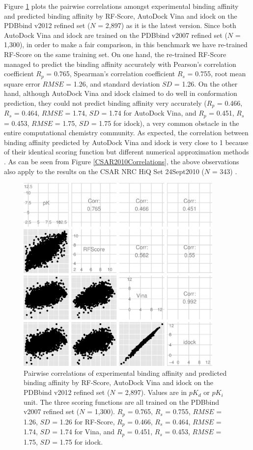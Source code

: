 Figure \ref{PDBbind2012Correlations} plots the pairwise correlations amongst experimental binding affinity and predicted binding affinity by RF-Score, AutoDock Vina and idock on the PDBbind v2012 \citep{529,530} refined set ($N$ = 2,897) as it is the latest version. Since both AutoDock Vina and idock are trained on the PDBbind v2007 refined set ($N$ = 1,300), in order to make a fair comparison, in this benchmark we have re-trained RF-Score on the same training set. On one hand, the re-trained RF-Score managed to predict the binding affinity accurately with Pearson's correlation coefficient $R_p$ = 0.765, Spearman's correlation coefficient $R_s$ = 0.755, root mean square error $RMSE$ = 1.26, and standard deviation $SD$ = 1.26. On the other hand, although AutoDock Vina and idock claimed to do well in conformation prediction, they could not predict binding affinity very accurately ($R_p$ = 0.466, $R_s$ = 0.464, $RMSE$ = 1.74, $SD$ = 1.74 for AutoDock Vina, and $R_p$ = 0.451, $R_s$ = 0.453, $RMSE$ = 1.75, $SD$ = 1.75 for idock), a very common obstacle in the entire computational chemistry community. As expected, the correlation between binding affinity predicted by AutoDock Vina and idock is very close to 1 because of their identical scoring function but different numerical approximation methods \citep{1153}. As can be seen from Figure \ref{CSAR2010Correlations}, the above observations also apply to the results on the CSAR NRC HiQ Set 24Sept2010 ($N$ = 343) \citep{857,960}.

\begin{figure}
\begin{center}
\includegraphics[width=4in]{../istar/PDBbind2012Correlations.eps}
\end{center}
\caption{Pairwise correlations of experimental binding affinity and predicted binding affinity by RF-Score, AutoDock Vina and idock on the PDBbind v2012 refined set ($N$ = 2,897). Values are in $pK_d$ or $pK_i$ unit. The three scoring functions are all trained on the PDBbind v2007 refined set ($N$ = 1,300). $R_p$ = 0.765, $R_s$ = 0.755, $RMSE$ = 1.26, $SD$ = 1.26 for RF-Score, $R_p$ = 0.466, $R_s$ = 0.464, $RMSE$ = 1.74, $SD$ = 1.74 for Vina, and $R_p$ = 0.451, $R_s$ = 0.453, $RMSE$ = 1.75, $SD$ = 1.75 for idock.}
\label{PDBbind2012Correlations}
\end{figure}

